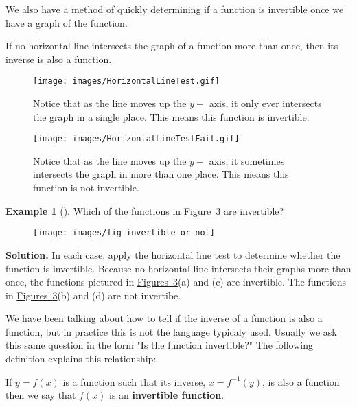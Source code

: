 \documentclass[10pt,]{book}
\newcommand{\terminology}[1]{\textbf{#1}}
\theoremstyle{plain}
\theoremstyle{definition}
\theoremstyle{definition}
\theoremstyle{definition}
\newtheorem{example}[theorem]{Example}
\theoremstyle{definition}
\numberwithin{equation}{section}
\begin{document}
\hypertarget{p-113}{}%
We also have a method of quickly determining if a function is invertible once we have a graph of the function.%
\begin{assemblage}\label{assemblage-17}
\hypertarget{p-114}{}%
If no horizontal line intersects the graph of a function more than once, then its inverse is also a function.%
\end{assemblage}
\begin{figure}
\centering
\texttt{[image: images/HorizontalLineTest.gif]}
\caption{Notice that as the line moves up the \(y-\) axis, it only ever intersects the graph in a single place.  This means this function is invertible.\label{fig-horizontal-line-test-animation}}
\end{figure}
\begin{figure}
\centering
\texttt{[image: images/HorizontalLineTestFail.gif]}
\caption{Notice that as the line moves up the \(y-\) axis, it sometimes intersects the graph in more than one place.  This means this function is not invertible.\label{fig-horizontal-line-test-fail-animation}}
\end{figure}
\begin{example}[]\label{example-invertible-or-not}
\hypertarget{p-115}{}%
Which of the functions in \hyperref[fig-invertible-or-not]{Figure~\ref{fig-invertible-or-not}} are invertible?%
\begin{figure}
\centering
\texttt{[image: images/fig-invertible-or-not]}
\caption{\label{fig-invertible-or-not}}
\end{figure}
\par\smallskip%
\noindent\textbf{Solution.}\hypertarget{solution-9}{}\quad%
\hypertarget{p-116}{}%
In each case, apply the horizontal line test to determine whether the function is invertible. Because no horizontal line intersects their graphs more than once, the functions pictured in \hyperref[fig-invertible-or-not]{Figures~\ref{fig-invertible-or-not}}(a) and (c) are invertible. The functions in \hyperref[fig-invertible-or-not]{Figures~\ref{fig-invertible-or-not}}(b) and (d) are not invertibe.%
\end{example}
\hypertarget{p-117}{}%
We have been talking about how to tell if the inverse of a function is also a function, but in practice this is not the language typicaly used. Usually we ask this same question in the form "Is the function invertible?" The following definition explains this relationship: \begin{assemblage}\label{assemblage-18}
\hypertarget{p-118}{}%
If \(y=f(x) \) is a function such that its inverse, \(x=f^{-1}(y)\), is also a function then we say that \(f(x) \) is an \terminology{invertible function}.%
\end{assemblage}
\end{document}
